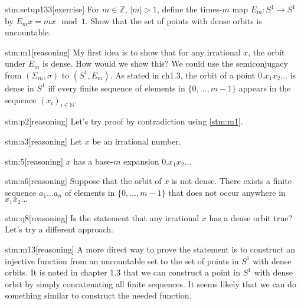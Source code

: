 \documentclass{article}
\begin{document}

\begin{stm}{stm:setup133}[exercise]
For $m \in \mathbb{Z}$, $|m| > 1$, define the times-$m$ map $E_m : S^1 \to S^1$ by $E_m x = mx \mod 1$. Show that the set of points with dense orbits is uncountable.
\end{stm}


\begin{stm}{stm:m1}[reasoning]
My first idea is to show that for any irrational $x$, the orbit under $E_m$ is dense. How would we show this? We could use the semiconjugacy from $(\Sigma_m, \sigma)$ to $(S^1, E_m)$. As stated in ch1.3, the orbit of a point $0.x_1 x_2 \dots$ is dense in $S^1$ iff every finite sequence of elements in $\{0, \dots, m-1\}$ appears in the sequence $(x_i)_{i \in \mathbb{N}}$.
\end{stm}

\begin{stm}{stm:p2}[reasoning]
Let's try proof by contradiction using \ref{stm:m1}.
\end{stm}

\begin{stm}{stm:a3}[reasoning]
Let $x$ be an irrational number.
\end{stm}

\begin{stm}{stm:5}[reasoning]
$x$ has a base-$m$ expansion $0.x_1 x_2 \dots$
\end{stm}

\begin{stm}{stm:a6}[reasoning]
Suppose that the orbit of $x$ is not dense. There exists a finite sequence $a_1 \dots a_n$ of elements in $\{0, \dots, m-1\}$ that does not occur anywhere in $x_1 x_2 \dots$
\end{stm}

\begin{stm}{stm:q8}[reasoning]
Is the statement that any irrational $x$ has a dense orbit true? Let's try a different approach.
\end{stm}

\begin{stm}{stm:m13}[reasoning]
A more direct way to prove the statement is to construct an injective function from an uncountable set to the set of points in $S^1$ with dense orbits. It is noted in chapter 1.3 that we can construct a point in $S^1$ with dense orbit by simply concatenating all finite sequences. It seems likely that we can do something similar to construct the needed function.
\end{stm}
\end{document}
